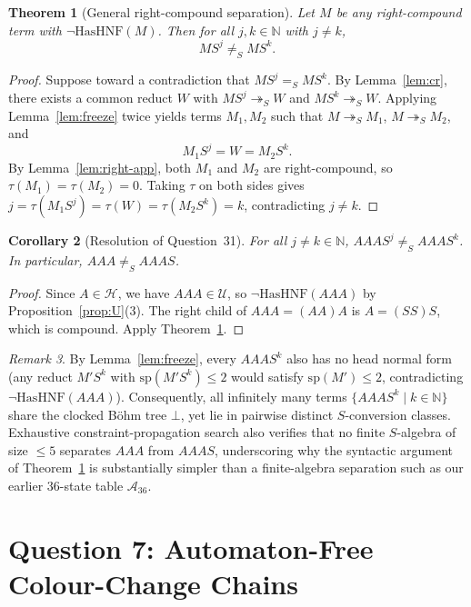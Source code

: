 \documentclass[11pt,reqno]{amsart}
\newtheorem{theorem}{Theorem}[section]
\newtheorem{corollary}[theorem]{Corollary}
\theoremstyle{definition}
\theoremstyle{remark}
\newtheorem{remark}[theorem]{Remark}
\newcommand{\redS}{\twoheadrightarrow_S}
\newcommand{\convS}{=_S}
\begin{document}
\begin{theorem}[General right-compound separation]\label{thm:general-q31}
Let $M$ be any right-compound term with $\neg \mathrm{HasHNF}(M)$. Then for all $j, k \in \mathbb{N}$ with $j \neq k$,
\[
  M S^j \neq_S M S^k.
\]
\end{theorem}

\begin{proof}
Suppose toward a contradiction that $M S^j \convS M S^k$. By Lemma~\ref{lem:cr}, there exists a common reduct $W$ with $M S^j \redS W$ and $M S^k \redS W$. Applying Lemma~\ref{lem:freeze} twice yields terms $M_1, M_2$ such that $M \redS M_1$, $M \redS M_2$, and
\[
  M_1 S^j = W = M_2 S^k.
\]
By Lemma~\ref{lem:right-app}, both $M_1$ and $M_2$ are right-compound, so $\tau(M_1) = \tau(M_2) = 0$. Taking $\tau$ on both sides gives $j = \tau(M_1 S^j) = \tau(W) = \tau(M_2 S^k) = k$, contradicting $j \neq k$.
\end{proof}

\begin{corollary}[Resolution of Question~31]\label{cor:q31}
For all $j \neq k \in \mathbb{N}$, $A A A S^j \neq_S A A A S^k$. In particular, $A A A \neq_S A A A S$.
\end{corollary}

\begin{proof}
Since $A \in \mathcal{H}$, we have $A A A \in \mathcal{U}$, so $\neg \mathrm{HasHNF}(A A A)$ by Proposition~\ref{prop:U}(3). The right child of $A A A = (A A) A$ is $A = (S S) S$, which is compound. Apply Theorem~\ref{thm:general-q31}.
\end{proof}

\begin{remark}
By Lemma~\ref{lem:freeze}, every $A A A S^k$ also has no head normal form (any reduct $M' S^k$ with $\mathrm{sp}(M' S^k) \le 2$ would satisfy $\mathrm{sp}(M') \le 2$, contradicting $\neg \mathrm{HasHNF}(A A A)$). Consequently, all infinitely many terms $\{A A A S^k \mid k \in \mathbb{N}\}$ share the clocked B\"ohm tree $\bot$, yet lie in pairwise distinct $S$-conversion classes. Exhaustive constraint-propagation search also verifies that no finite $S$-algebra of size $\le 5$ separates $A A A$ from $A A A S$, underscoring why the syntactic argument of Theorem~\ref{thm:general-q31} is substantially simpler than a finite-algebra separation such as our earlier $36$-state table $\mathcal{A}_{36}$.
\end{remark}

\section{Question 7: Automaton-Free Colour-Change Chains}\label{sec:q7}
\end{document}
